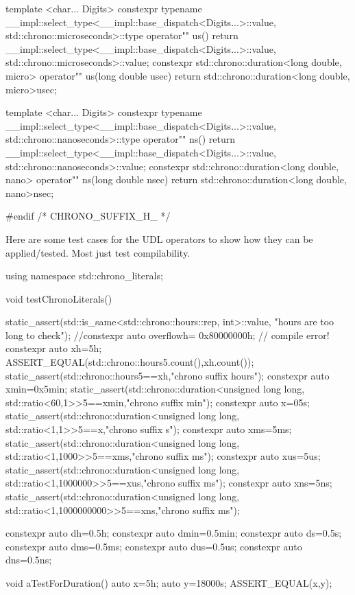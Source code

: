 \documentclass[ebook,11pt,article]{memoir}
\begin{document}
\begin{codeblock}
{{{template <char... Digits>
constexpr typename
__impl::select_type<__impl::base_dispatch<Digits...>::value,
std::chrono::microseconds>::type
operator"" us(){
	return __impl::select_type<__impl::base_dispatch<Digits...>::value,
	       std::chrono::microseconds>::value;
}
constexpr std::chrono::duration<long double, micro>
operator"" us(long double usec){
	return std::chrono::duration<long double, micro>{usec};
}

template <char... Digits>
constexpr typename
__impl::select_type<__impl::base_dispatch<Digits...>::value,
std::chrono::nanoseconds>::type
operator"" ns(){
	return __impl::select_type<__impl::base_dispatch<Digits...>::value,
	       std::chrono::nanoseconds>::value;
}
constexpr std::chrono::duration<long double, nano>
operator"" ns(long double nsec){
	return std::chrono::duration<long double, nano>{nsec};
}

}}}
#endif /* CHRONO_SUFFIX_H_ */
\end{codeblock}

Here are some test cases for the UDL operators to show how they can be applied/tested. Most just test compilability.
\begin{codeblock}

using namespace std::chrono_literals;

void testChronoLiterals(){
	static_assert(std::is_same<std::chrono::hours::rep, int>::value,
	              "hours are too long to check");
	//constexpr auto overflowh= 0x80000000h; // compile error!
	constexpr auto xh=5h;
	ASSERT_EQUAL(std::chrono::hours{5}.count(),xh.count());
	static_assert(std::chrono::hours{5}==xh,"chrono suffix hours");
	constexpr auto xmin=0x5min;
	static_assert(std::chrono::duration<unsigned long long,
	              std::ratio<60,1>>{5}==xmin,"chrono suffix min");
	constexpr auto x=05s;
	static_assert(std::chrono::duration<unsigned long long,
	              std::ratio<1,1>>{5}==x,"chrono suffix s");
	constexpr auto xms=5ms;
	static_assert(std::chrono::duration<unsigned long long,
	              std::ratio<1,1000>>{5}==xms,"chrono suffix ms");
	constexpr auto xus=5us;
	static_assert(std::chrono::duration<unsigned long long,
	              std::ratio<1,1000000>>{5}==xus,"chrono suffix ms");
	constexpr auto xns=5ns;
	static_assert(std::chrono::duration<unsigned long long,
	              std::ratio<1,1000000000>>{5}==xns,"chrono suffix ms");

	constexpr auto dh=0.5h;
	constexpr auto dmin=0.5min;
	constexpr auto ds=0.5s;
	constexpr auto dms=0.5ms;
	constexpr auto dus=0.5us;
	constexpr auto dns=0.5ns;
}
void aTestForDuration(){
	auto  x=5h;
	auto y=18000s;
	ASSERT_EQUAL(x,y);
}
\end{codeblock}
\end{document}
